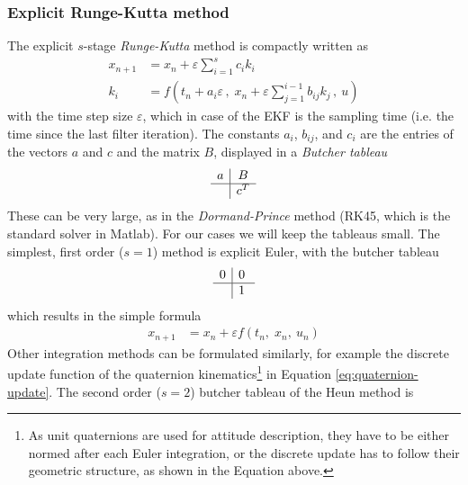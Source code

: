 \subsubsection{Explicit Runge-Kutta method}
The explicit $s$-stage \textit{Runge-Kutta} method is compactly written as \cite{griffiths2010}
\begin{align}
    x_{n+1} &= x_n + \varepsilon \sum_{i=1}^{s} c_i k_i
    \\
    k_i &= f \left( t_n + a_i \varepsilon \, , \; x_n + \varepsilon \sum_{j=1}^{i-1} b_{ij} k_j \, , \ u \right) 
\end{align}
with the time step size $\varepsilon$, which in case of the EKF is the sampling time (i.e. the time since the last filter iteration).
The constants $a_i$, $b_{ij}$, and $c_i$ are the entries of the vectors $a$ and $c$ and the matrix $B$, displayed in a \textit{Butcher tableau}
\begin{equation}
    \begin{array}{c|c}
        a & B \\
        \hline 
        & c^T
        \end{array}
    \label{eq:appendix_general_butcher}
\end{equation}
These can be very large, as in the \textit{Dormand-Prince} method (RK45, which is the standard solver in Matlab).
For our cases we will keep the tableaus small.
The simplest, first order ($s=1$) method is explicit Euler, with the butcher tableau \cite{griffiths2010}
\begin{equation}
    \begin{array}{c|cc}
        0 & 0 \;\\
        \hline 
        & 1 \;
        \end{array}
    \label{eq:appendix_euler_butcher}
\end{equation}
which results in the simple formula
\begin{align}
    x_{n+1} &= x_n + \varepsilon f \left( t_n, \; x_n, \ u_n \right)
\end{align}
Other integration methods can be formulated similarly, for example the discrete update function of the quaternion kinematics\footnote{As unit quaternions are used for attitude description, they have to be either normed after each Euler integration, or the discrete update has to follow their geometric structure, as shown in the Equation above.} in Equation \ref{eq:quaternion-update}.
The second order ($s=2$) butcher tableau of the Heun method \cite{griffiths2010} is 
